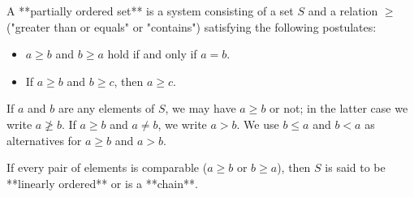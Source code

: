 A **partially ordered set** is a system consisting of a set $S$ and a relation $\geq$ ("greater than or equals" or "contains") satisfying the following postulates:

\begin{itemize}
\item[P1.] $a \geq b$ and $b \geq a$ hold if and only if $a = b$.
\item[P2.] If $a \geq b$ and $b \geq c$, then $a \geq c$.
\end{itemize}

If $a$ and $b$ are any elements of $S$, we may have $a \geq b$ or not; in the latter case we write $a \ngeq b$. If $a \geq b$ and $a \neq b$, we write $a > b$. We use $b \leq a$ and $b < a$ as alternatives for $a \geq b$ and $a > b$.

If every pair of elements is comparable ($a \geq b$ or $b \geq a$), then $S$ is said to be **linearly ordered** or is a **chain**.
